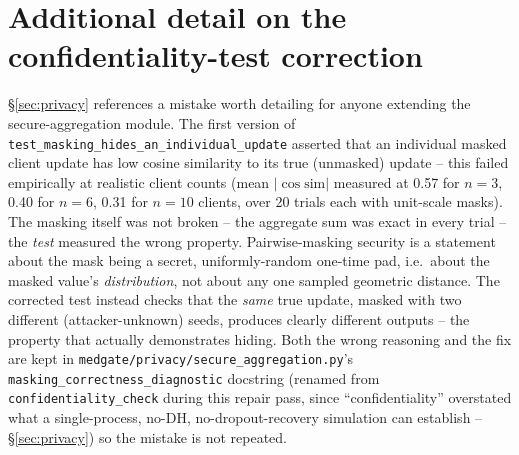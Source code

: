 \documentclass[11pt]{article}
\begin{document}
\section{Additional detail on the confidentiality-test correction}
\label{app:confidentiality-fix}
\S\ref{sec:privacy} references a mistake worth detailing for anyone
extending the secure-aggregation module. The first version of
\texttt{test\_masking\_hides\_an\_individual\_update} asserted that an
individual masked client update has low cosine similarity to its true
(unmasked) update -- this failed empirically at realistic client counts
(mean $|\cos\text{sim}|$ measured at 0.57 for $n{=}3$, 0.40 for $n{=}6$,
0.31 for $n{=}10$ clients, over 20 trials each with unit-scale masks). The
masking itself was not broken -- the aggregate sum was exact in every
trial -- the \emph{test} measured the wrong property. Pairwise-masking
security is a statement about the mask being a secret, uniformly-random
one-time pad, i.e.\ about the masked value's \emph{distribution}, not about
any one sampled geometric distance. The corrected test instead checks that
the \emph{same} true update, masked with two different (attacker-unknown)
seeds, produces clearly different outputs -- the property that actually
demonstrates hiding. Both the wrong reasoning and the fix are kept in
\texttt{medgate/privacy/secure\_aggregation.py}'s
\texttt{masking\_correctness\_diagnostic} docstring (renamed from
\texttt{confidentiality\_check} during this repair pass, since
``confidentiality'' overstated what a single-process, no-DH,
no-dropout-recovery simulation can establish -- \S\ref{sec:privacy}) so the
mistake is not repeated.
\end{document}
